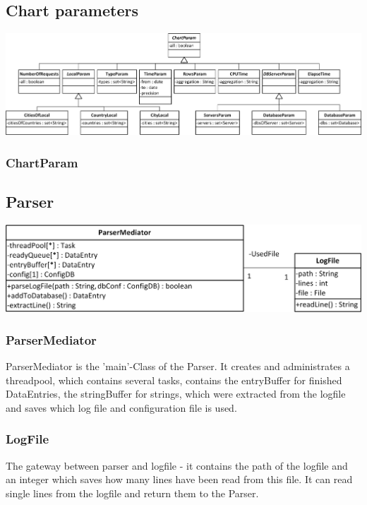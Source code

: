 \subsection{Chart parameters}
\begin{center}
\includegraphics[width=1\linewidth]{Pictures/Parts/ChartPara.png}
\end{center}  
\subsubsection*{ChartParam} 


\subsection{Parser}

\begin{center}
\includegraphics{Pictures/Parts/ParsMedi.png}
\end{center}  

\subsubsection*{ParserMediator}
ParserMediator is the 'main'-Class of the Parser. It creates and administrates a threadpool, which contains several tasks, 
contains the entryBuffer for finished DataEntries, the stringBuffer for strings, which were extracted 
from the logfile and saves which log file and configuration file is used.

\subsubsection*{LogFile}
The gateway between parser and logfile - it contains the path of the logfile and an integer 
which saves how many lines have been read from this file. It can read single lines from the logfile and return them to 
the Parser.

